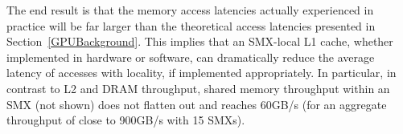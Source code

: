 The end result is that the memory access latencies actually experienced in
practice will be far larger than the theoretical access latencies presented in
Section~\ref{GPUBackground}.
This implies that an SMX-local L1 cache, whether implemented in hardware or software, can
dramatically reduce the average latency of accesses with locality, if implemented appropriately.
In particular, in contrast to L2 and DRAM throughput,  shared memory throughput within an SMX (not shown) does not flatten out and reaches 60GB/s (for an aggregate throughput of close to 900GB/s with 15 SMXs).








